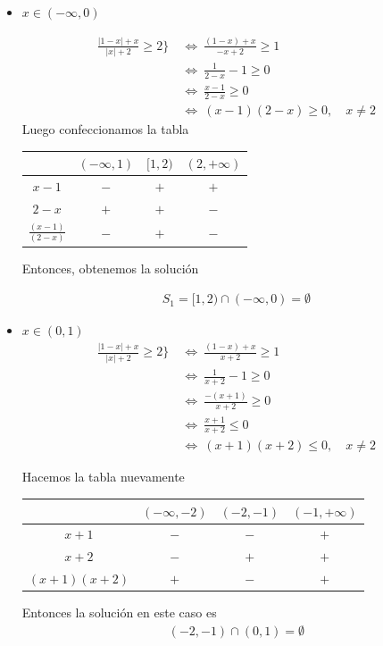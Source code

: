 \documentclass[12pt]{book}
\begin{document}
\begin{itemize}
    \item $x \in (-\infty,0)$

\begin{align*}
    \frac{|1-x|+x}{|x|+2}\geq2\} \ &\Longleftrightarrow  \ \frac{(1-x)+x}{-x+2} \geq 1\\
    &\Longleftrightarrow \ \frac{1}{2-x}-1 \geq 0 \\
     &\Longleftrightarrow \ \frac{x-1}{2-x}\geq 0 \\
     \ &\Longleftrightarrow \ (x-1)(2-x) \geq 0, \quad x\neq 2
\end{align*}
Luego confeccionamos la tabla

\begin{center}
\begin{tabular}{|c|c|c|c|}
\hline
   & $(-\infty,1) $  & $[1,2)$ & $(2,+\infty)$ \\
   \hline
   $x-1$ & $-$ &$+$ &  $+$ \\ \hline
   $2-x$ & $+$ & $+$ & $-$ \\ \hline \hline
\rule{0pt}{0pt} $\displaystyle \frac{(x-1)}{(2-x)}$ & $-$ & $+$ & $-$ \\
   \hline
\end{tabular}
\end{center}

Entonces, obtenemos la solución

\begin{align*}
    S_1= [1,2) \cap (-\infty,0)=\emptyset
\end{align*}

\item $x \in (0,1)$
\begin{align*}
    \frac{|1-x|+x}{|x|+2}\geq2\} \ &\Longleftrightarrow \ \frac{(1-x)+x}{x+2} \geq 1\\
    &\Longleftrightarrow \ \frac{1}{x+2}-1 \geq 0 \\
     &\Longleftrightarrow \ \frac{-(x+1)}{x+2} \geq 0 \\
      &\Longleftrightarrow \ \frac{x+1}{x+2} \leq 0 \\
       &\Longleftrightarrow \ (x+1)(x+2) \leq 0,\quad x\neq2
\end{align*}

Hacemos la tabla nuevamente

\begin{center}
\begin{tabular}{|c|c|c|c|}
\hline
   & $(-\infty,-2) $  & $(-2,-1)$ & $(-1,+\infty)$ \\
   \hline
   $x+1$ & $-$ &$-$ &  $+$ \\ \hline
   $x+2$ & $-$ & $+$ & $+$ \\ \hline \hline
\rule{0pt}{0pt} $\displaystyle (x+1)(x+2)$ & $+$ & $-$ & $+$ \\
   \hline
\end{tabular}
\end{center}
Entonces la solución en este caso es
\begin{align*}
    (-2,-1) \cap(0,1)=\emptyset
\end{align*}


\end{itemize}
\end{document}
